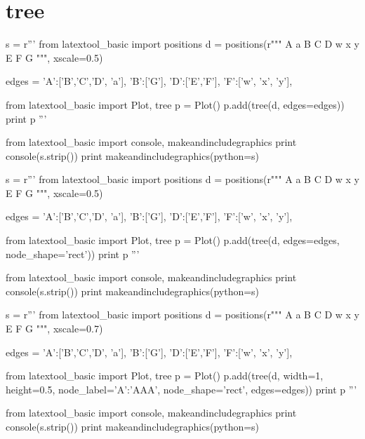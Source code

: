 \section{tree}

\begin{python}
s = r'''
from latextool_basic import positions
d = positions(r"""
  A   a 
B C D    w x y
    E F  
G
""", xscale=0.5)

edges = {'A':['B','C','D', 'a'],
         'B':['G'],
         'D':['E','F'],
         'F':['w', 'x', 'y'],
}

from latextool_basic import Plot, tree
p = Plot()
p.add(tree(d, edges=edges))
print p
'''

from latextool_basic import console, makeandincludegraphics
print console(s.strip())
print makeandincludegraphics(python=s)
\end{python}




\begin{python}
s = r'''
from latextool_basic import positions
d = positions(r"""
  A   a 
B C D    w x y
    E F  
G
""", xscale=0.5)

edges = {'A':['B','C','D', 'a'],
         'B':['G'],
         'D':['E','F'],
         'F':['w', 'x', 'y'],
}

from latextool_basic import Plot, tree
p = Plot()
p.add(tree(d, edges=edges, node_shape='rect'))
print p
'''

from latextool_basic import console, makeandincludegraphics
print console(s.strip())
print makeandincludegraphics(python=s)
\end{python}




\begin{python}
s = r'''
from latextool_basic import positions
d = positions(r"""
  A   a 
B C D    w x y
    E F  
G
""", xscale=0.7)

edges = {'A':['B','C','D', 'a'],
         'B':['G'],
         'D':['E','F'],
         'F':['w', 'x', 'y'],
}

from latextool_basic import Plot, tree
p = Plot()
p.add(tree(d,
           width=1, height=0.5, 
           node_label={'A':'AAA'},
           node_shape='rect',
           edges=edges))
print p
'''

from latextool_basic import console, makeandincludegraphics
print console(s.strip())
print makeandincludegraphics(python=s)
\end{python}







